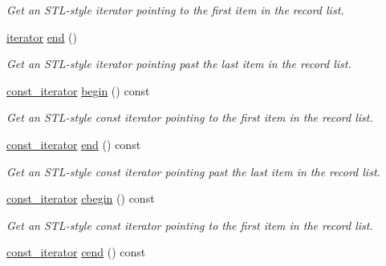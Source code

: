 \begin{DoxyCompactItemize}
\begin{DoxyCompactList}\small\item\em Get an S\+T\+L-\/style iterator pointing to the first item in the record list. \end{DoxyCompactList}\item 
\hyperlink{class_mdt_1_1_plain_text_1_1_record_list_template_a5b0caae56b05a38e53539cad1da8cd12}{iterator} \hyperlink{class_mdt_1_1_plain_text_1_1_record_list_template_accf34cd248a894d4af04510312bbdf23}{end} ()
\begin{DoxyCompactList}\small\item\em Get an S\+T\+L-\/style iterator pointing past the last item in the record list. \end{DoxyCompactList}\item 
\hyperlink{class_mdt_1_1_plain_text_1_1_record_list_template_abfba36291fe9cb605ec432ed873ce4ea}{const\+\_\+iterator} \hyperlink{class_mdt_1_1_plain_text_1_1_record_list_template_a2811685c9280d271f83bcff058658533}{begin} () const 
\begin{DoxyCompactList}\small\item\em Get an S\+T\+L-\/style const iterator pointing to the first item in the record list. \end{DoxyCompactList}\item 
\hyperlink{class_mdt_1_1_plain_text_1_1_record_list_template_abfba36291fe9cb605ec432ed873ce4ea}{const\+\_\+iterator} \hyperlink{class_mdt_1_1_plain_text_1_1_record_list_template_abaa79756cbf4ff040525344c03871f58}{end} () const 
\begin{DoxyCompactList}\small\item\em Get an S\+T\+L-\/style const iterator pointing past the last item in the record list. \end{DoxyCompactList}\item 
\hyperlink{class_mdt_1_1_plain_text_1_1_record_list_template_abfba36291fe9cb605ec432ed873ce4ea}{const\+\_\+iterator} \hyperlink{class_mdt_1_1_plain_text_1_1_record_list_template_a95499c9fa8b7bfe2f024d2d71931827e}{cbegin} () const 
\begin{DoxyCompactList}\small\item\em Get an S\+T\+L-\/style const iterator pointing to the first item in the record list. \end{DoxyCompactList}\item 
\hyperlink{class_mdt_1_1_plain_text_1_1_record_list_template_abfba36291fe9cb605ec432ed873ce4ea}{const\+\_\+iterator} \hyperlink{class_mdt_1_1_plain_text_1_1_record_list_template_adbc8ef6c14603d50d96774fd81837a6c}{cend} () const 

\end{DoxyCompactItemize}
